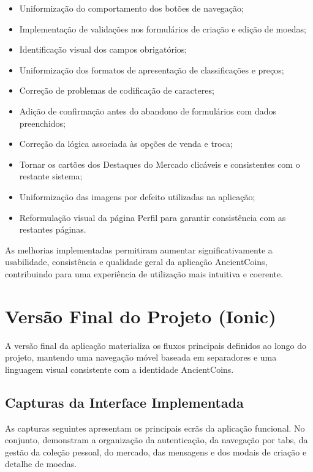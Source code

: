\documentclass[12pt,a4paper]{article}
\begin{document}
\begin{itemize}
\setlength{\itemsep}{0.15em}
\item Uniformização do comportamento dos botões de navegação;
\item Implementação de validações nos formulários de criação e edição de moedas;
\item Identificação visual dos campos obrigatórios;
\item Uniformização dos formatos de apresentação de classificações e preços;
\item Correção de problemas de codificação de caracteres;
\item Adição de confirmação antes do abandono de formulários com dados preenchidos;
\item Correção da lógica associada às opções de venda e troca;
\item Tornar os cartões dos Destaques do Mercado clicáveis e consistentes com o restante sistema;
\item Uniformização das imagens por defeito utilizadas na aplicação;
\item Reformulação visual da página Perfil para garantir consistência com as restantes páginas.
\end{itemize}

As melhorias implementadas permitiram aumentar significativamente a usabilidade, consistência e qualidade geral da aplicação AncientCoins, contribuindo para uma experiência de utilização mais intuitiva e coerente.

\section{Versão Final do Projeto (Ionic)}

A versão final da aplicação materializa os fluxos principais definidos ao longo do projeto, mantendo uma navegação móvel baseada em separadores e uma linguagem visual consistente com a identidade AncientCoins.

\subsection{Capturas da Interface Implementada}

As capturas seguintes apresentam os principais ecrãs da aplicação funcional. No conjunto, demonstram a organização da autenticação, da navegação por tabs, da gestão da coleção pessoal, do mercado, das mensagens e dos modais de criação e detalhe de moedas.
\end{document}

